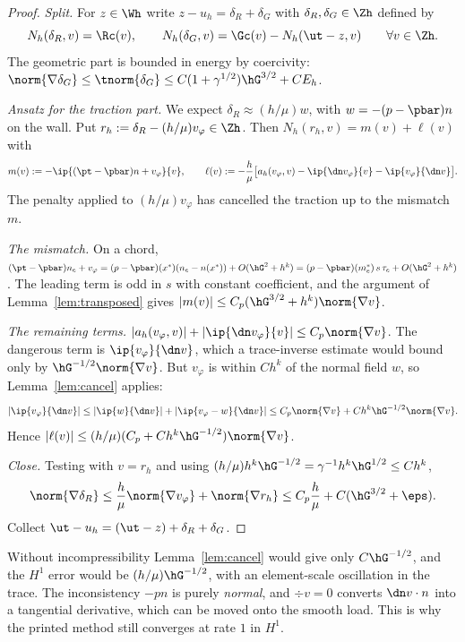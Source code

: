 \begin{proof}
\emph{Split.} For $z\in\Wh$ write $z-u_h=\delta_R+\delta_G$ with $\delta_R,\delta_G\in\Zh$ defined by
\[
N_h(\delta_R,v)=\Rc(v),\qquad N_h(\delta_G,v)=\Gc(v)-N_h(\ut-z,v)\qquad\forall v\in\Zh .
\]
The geometric part is bounded in energy by coercivity: $\norm{\nabla\delta_G}\le\tnorm{\delta_G}\le C(1+\gamma^{1/2})\hG^{3/2}+CE_h$.

\emph{Ansatz for the traction part.} We expect $\delta_R\approx(h/\mu)w$, with $w=-(p-\pbar)n$ on the wall. Put $r_h:=\delta_R-(h/\mu)v_\varphi\in\Zh$. Then $N_h(r_h,v)=m(v)+\ell(v)$ with
\[
m(v):=-\ip{(\pt-\pbar)n+v_\varphi}{v},\qquad
\ell(v):=-\frac h\mu\bigl[a_h(v_\varphi,v)-\ip{\dn v_\varphi}{v}-\ip{v_\varphi}{\dn v}\bigr].
\]
The penalty applied to $(h/\mu)v_\varphi$ has cancelled the traction up to the mismatch $m$.

\emph{The mismatch.} On a chord, $(\pt-\pbar)n_e+v_\varphi=(p-\pbar)(x^\ast)(n_e-n(x^\ast))+O(\hG^2+h^k)=(p-\pbar)(m_e^\ast)\,s\,\tau_e+O(\hG^2+h^k)$. The leading term is odd in $s$ with constant coefficient, and the argument of Lemma~\ref{lem:transposed} gives $|m(v)|\le C_p(\hG^{3/2}+h^k)\norm{\nabla v}$.

\emph{The remaining terms.} $|a_h(v_\varphi,v)|+|\ip{\dn v_\varphi}{v}|\le C_p\norm{\nabla v}$. The dangerous term is $\ip{v_\varphi}{\dn v}$, which a trace-inverse estimate would bound only by $\hG^{-1/2}\norm{\nabla v}$. But $v_\varphi$ is within $Ch^k$ of the normal field $w$, so Lemma~\ref{lem:cancel} applies:
\[
|\ip{v_\varphi}{\dn v}|\le|\ip{w}{\dn v}|+|\ip{v_\varphi-w}{\dn v}|\le C_p\norm{\nabla v}+Ch^k\hG^{-1/2}\norm{\nabla v}.
\]
Hence $|\ell(v)|\le(h/\mu)(C_p+Ch^k\hG^{-1/2})\norm{\nabla v}$.

\emph{Close.} Testing with $v=r_h$ and using $(h/\mu)h^k\hG^{-1/2}=\gamma^{-1}h^k\hG^{1/2}\le Ch^k$,
\[
\norm{\nabla\delta_R}\le\frac h\mu\norm{\nabla v_\varphi}+\norm{\nabla r_h}\le C_p\frac h\mu+C(\hG^{3/2}+\eps).
\]
Collect $\ut-u_h=(\ut-z)+\delta_R+\delta_G$.
\end{proof}

\begin{remark}
Without incompressibility Lemma~\ref{lem:cancel} would give only $C\hG^{-1/2}$, and the $H^1$ error would be $(h/\mu)\hG^{-1/2}$, with an element-scale oscillation in the trace. The inconsistency $-pn$ is purely \emph{normal}, and $\div v=0$ converts $\dn v\cdot n$ into a tangential derivative, which can be moved onto the smooth load. This is why the printed method still converges at rate $1$ in $H^1$.
\end{remark}

